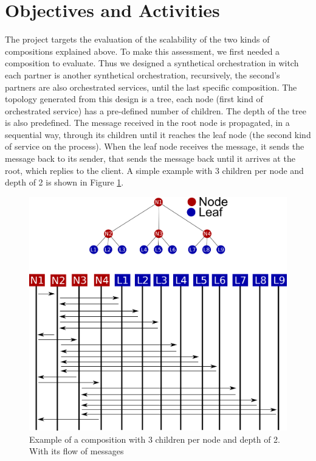 \section{Objectives and Activities}

The project targets the evaluation of the scalability of the two kinds of compositions explained above. To make this assessment, we first needed a composition to evaluate. Thus we designed a synthetical orchestration in witch each partner is another synthetical orchestration, recursively, the second's partners are also orchestrated services, until the last specific composition. The topology generated from this design is a tree, each node (first kind of orchestrated service) has a pre-defined number of children. The depth of the tree is also predefined. The message received in the root node is propagated, in a sequential way, through its children until it reaches the leaf node (the second kind of service on the process). When the leaf node receives the message, it sends the message back to its sender, that sends the message back until it arrives at the root, which replies to the client. A simple example with 3 children per node and depth of 2 is shown in Figure \ref{synthetical-example}.

\begin{figure}[htb]
	\centering
	\includegraphics[width=\textwidth]{images/synthetical-example}
	\caption{Example of a composition with 3 children per node and depth of 2. With its flow of messages}
	\label{synthetical-example}
\end{figure}

